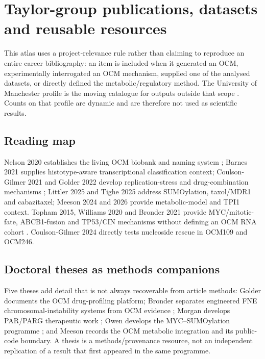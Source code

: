 \documentclass[10pt]{article}
\begin{document}
\section{Taylor-group publications, datasets and reusable resources}
\label{app:resources}

This atlas uses a project-relevance rule rather than claiming to reproduce an
entire career bibliography: an item is included when it generated an OCM,
experimentally interrogated an OCM mechanism, supplied one of the analysed
datasets, or directly defined the metabolic/regulatory method.  The University
of Manchester profile is the moving catalogue for outputs outside that scope
\cite{taylorprofile}.  Counts on that profile are dynamic and are therefore not
used as scientific results.

\subsection{Reading map}

Nelson 2020 establishes the living OCM biobank and naming system
\cite{nelson2020}; Barnes 2021 supplies histotype-aware transcriptional
classification context\cite{barnes2021}; Coulson-Gilmer 2021 and Golder 2022
develop replication-stress and drug-combination mechanisms
\cite{coulsongilmer2021,golder2022}; Littler 2025 and Tighe 2025 address
SUMOylation, taxol/MDR1 and cabazitaxel\cite{littler2025,tighe2025}; Meeson 2024
and 2026 provide metabolic-model and TPI1 context\cite{meeson2024,meeson2026}.
Topham 2015, Williams 2020 and Bronder 2021 provide MYC/mitotic-fate,
ABCB1-fusion and TP53/CIN mechanisms without defining an OCM RNA cohort
\cite{topham2015,williams2020,bronder2021}.  Coulson-Gilmer 2024 directly tests
nucleoside rescue in OCM109 and OCM246\cite{coulsongilmer2024}.

\subsection{Doctoral theses as methods companions}

Five theses add detail that is not always recoverable from article methods:
Golder documents the OCM drug-profiling platform\cite{golderthesis2021}; Bronder
separates engineered FNE chromosomal-instability systems from OCM evidence
\cite{bronderthesis2021}; Morgan develops PAR/PARG therapeutic work
\cite{morganthesis2021}; Owen develops the MYC--SUMOylation programme
\cite{owenthesis2023}; and Meeson records the OCM metabolic integration and its
public-code boundary\cite{meesonthesis2024}.  A thesis is a methods/provenance
resource, not an independent replication of a result that first appeared in
the same programme.
\end{document}
